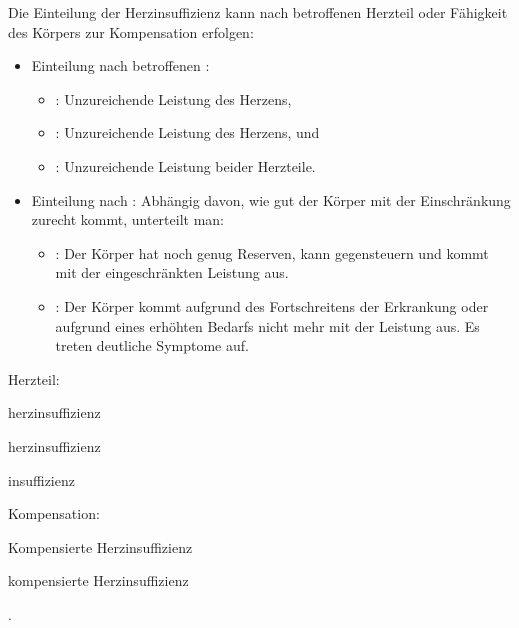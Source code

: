 \documentclass[
ngerman,
paper=a4,
asymmetric,
fontsize=10pt,
draft=false,
numbers=noenddot,
bibtotocnumbered,
footnotes=multiple,
]{scrreprt}
\newcommand{\jALT}{\vspace{6pt}\noindent{\color{red}\sffamily\textbf{DELETED}\hrulefill\newline}}
\newcommand{\jALTende}{\newline{\color{red}\rule{\linewidth}{2pt}\newline}}
\begin{document}
\jALT
 {Die Einteilung der Herzinsuffizienz kann nach betroffenen
 Herzteil oder Fähigkeit des Körpers zur Kompensation
 erfolgen:
 \begin{itemize}
   \item Einteilung nach betroffenen :
   \begin{itemize}
     \item {}: Unzureichende Leistung des 
    Herzens,
     \item {}:
    Unzureichende Leistung des  Herzens, und
     \item {}: Unzureichende Leistung beider Herzteile.
   \end{itemize}
   \item Einteilung nach : Abhängig davon, wie
   gut der Körper mit der
   Einschränkung zurecht kommt, unterteilt man:
   \begin{itemize}
     \item {}: Der Körper hat noch
    genug Reserven, kann gegensteuern und kommt mit der
    eingeschränkten Leistung aus.
     \item {}:
    Der Körper kommt aufgrund des Fortschreitens der
    Erkrankung oder aufgrund eines erhöhten Bedarfs nicht mehr
    mit der Leistung aus. Es treten deutliche
    Symptome auf.
   \end{itemize}
 \end{itemize}
 
 
 }{
 \begin{compactitem}
   \item Herzteil:
   \begin{compactitem}
     \item {}herzinsuffizienz
     \item {}herzinsuffizienz
     \item {}insuffizienz
   \end{compactitem}
   \item Kompensation:
   \begin{compactitem}
     \item Kompensierte Herzinsuffizienz
     \item {}kompensierte Herzinsuffizienz
   \end{compactitem}
 \end{compactitem}
 }{}{}{}
.
\jALTende
\end{document}
